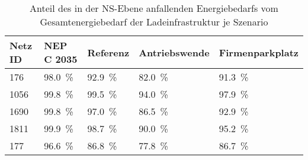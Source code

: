 {
\renewcommand{\arraystretch}{1.2}%
\begin{table}[H]
	\begin{center}
		\caption{Anteil des in der NS-Ebene anfallenden Energiebedarfs vom Gesamtenergiebedarf der Ladeinfrastruktur je Szenario}
		\begin{tabu} to 0.8\textwidth {X[0.65] X[1, r] X[0.9, r] X[1.4, r] X[1.4, r]}
			\toprule
			Netz ID    & NEP C \num{2035}    & Referenz            & Antriebswende       & \glqq Firmenparkplatz\grqq \\ \midrule
			\num{176}  & \SI{98.0}{\percent} & \SI{92.9}{\percent} & \SI{82.0}{\percent} & \SI{91.3}{\percent}        \\
			\num{1056} & \SI{99.8}{\percent} & \SI{99.5}{\percent} & \SI{94.0}{\percent} & \SI{97.9}{\percent}        \\
			\num{1690} & \SI{99.8}{\percent} & \SI{97.0}{\percent} & \SI{86.5}{\percent} & \SI{92.9}{\percent}        \\
			\num{1811} & \SI{99.9}{\percent} & \SI{98.7}{\percent} & \SI{90.0}{\percent} & \SI{95.2}{\percent}        \\
			\num{177}  & \SI{96.6}{\percent} & \SI{86.8}{\percent} & \SI{77.8}{\percent} & \SI{86.7}{\percent}        \\ \bottomrule
		\end{tabu}
		\label{tab:lvConnectionShare}
	\end{center}
	\vspace{-3mm}%
\end{table}
}